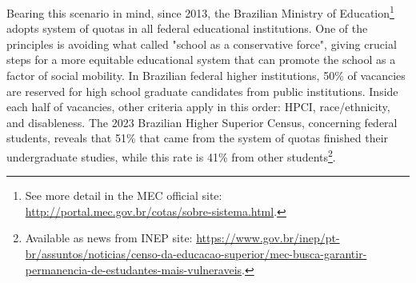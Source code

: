 Bearing this scenario in mind, since 2013, the Brazilian Ministry of Education\footnote{See more detail in the \gls{MEC} official site: \url{http://portal.mec.gov.br/cotas/sobre-sistema.html}.} adopts system of quotas in all federal educational institutions. One of the principles is avoiding what  called "school as a conservative force", giving crucial steps for a more equitable educational system that can promote the school as a factor of social mobility. In Brazilian federal higher institutions, 50\% of vacancies are reserved for high school graduate candidates from public institutions. Inside each half of vacancies, other criteria apply in this order: \gls{HPCI}, race/ethnicity, and disableness. The 2023 Brazilian Higher Superior Census, concerning federal students, reveals that 51\% that came from the system of quotas finished their undergraduate studies, while this rate is 41\% from other students\footnote{Available as news from \gls{INEP} site: \url{https://www.gov.br/inep/pt-br/assuntos/noticias/censo-da-educacao-superior/mec-busca-garantir-permanencia-de-estudantes-mais-vulneraveis}.}.